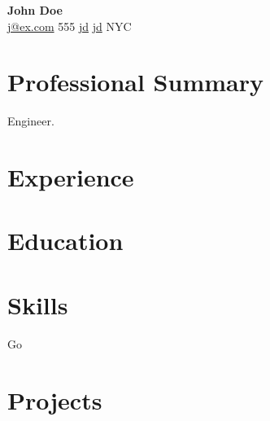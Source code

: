 \documentclass[10pt,letterpaper]{article}
\newcommand{\expentry}[4]{%
  \vspace{5pt}%
  {\raggedright\textbf{#1}\hfill\textit{#4}}\par\nopagebreak
  {\raggedright\textit{#2}\hfill#3}\par\nopagebreak
  \vspace{1pt}%
}
\newcommand{\eduentry}[4]{%
  \vspace{5pt}%
  {\raggedright\textbf{#1}\hfill\textit{#4}}\par\nopagebreak
  {\raggedright\textit{#2}\hfill#3}\par\nopagebreak
  \vspace{1pt}%
}
\newcommand{\projentry}[3]{%
  \vspace{5pt}%
  {\raggedright\textbf{#1}\enspace---\enspace\textit{#2}\hfill#3}\par\nopagebreak
  \vspace{1pt}%
}
\begin{document}
\begin{center}
  {\LARGE\bfseries John Doe}\\[3pt]
  \mbox{\enspace{}\href{mailto:j@ex.com}{j@ex.com}}\quad
  \mbox{\enspace{}555}\quad
  \mbox{\enspace{}\href{https://linkedin.com/in/jd}{jd}}\quad
  \mbox{\enspace{}\href{https://github.com/jd}{jd}}\quad
  \mbox{\enspace{}NYC}
\end{center}

\vspace{-2pt}

\section{Professional Summary}
Engineer.

\section{Experience}


\section{Education}


\section{Skills}
Go

\section{Projects}
\end{document}
